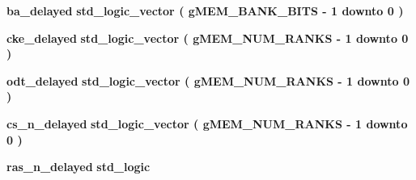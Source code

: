 \begin{DoxyCompactItemize}
\item 
{\bf ba\+\_\+delayed} {\bfseries \textcolor{comment}{std\+\_\+logic\+\_\+vector}\textcolor{vhdlchar}{ }\textcolor{vhdlchar}{(}\textcolor{vhdlchar}{ }\textcolor{vhdlchar}{ }\textcolor{vhdlchar}{ }\textcolor{vhdlchar}{ }{\bfseries {\bf g\+M\+E\+M\+\_\+\+B\+A\+N\+K\+\_\+\+B\+I\+TS}} \textcolor{vhdlchar}{-\/}\textcolor{vhdlchar}{ } \textcolor{vhdldigit}{1} \textcolor{vhdlchar}{ }\textcolor{keywordflow}{downto}\textcolor{vhdlchar}{ }\textcolor{vhdlchar}{ } \textcolor{vhdldigit}{0} \textcolor{vhdlchar}{ }\textcolor{vhdlchar}{)}\textcolor{vhdlchar}{ }} 
\item 
{\bf cke\+\_\+delayed} {\bfseries \textcolor{comment}{std\+\_\+logic\+\_\+vector}\textcolor{vhdlchar}{ }\textcolor{vhdlchar}{(}\textcolor{vhdlchar}{ }\textcolor{vhdlchar}{ }\textcolor{vhdlchar}{ }\textcolor{vhdlchar}{ }{\bfseries {\bf g\+M\+E\+M\+\_\+\+N\+U\+M\+\_\+\+R\+A\+N\+KS}} \textcolor{vhdlchar}{-\/}\textcolor{vhdlchar}{ } \textcolor{vhdldigit}{1} \textcolor{vhdlchar}{ }\textcolor{keywordflow}{downto}\textcolor{vhdlchar}{ }\textcolor{vhdlchar}{ } \textcolor{vhdldigit}{0} \textcolor{vhdlchar}{ }\textcolor{vhdlchar}{)}\textcolor{vhdlchar}{ }} 
\item 
{\bf odt\+\_\+delayed} {\bfseries \textcolor{comment}{std\+\_\+logic\+\_\+vector}\textcolor{vhdlchar}{ }\textcolor{vhdlchar}{(}\textcolor{vhdlchar}{ }\textcolor{vhdlchar}{ }\textcolor{vhdlchar}{ }\textcolor{vhdlchar}{ }{\bfseries {\bf g\+M\+E\+M\+\_\+\+N\+U\+M\+\_\+\+R\+A\+N\+KS}} \textcolor{vhdlchar}{-\/}\textcolor{vhdlchar}{ } \textcolor{vhdldigit}{1} \textcolor{vhdlchar}{ }\textcolor{keywordflow}{downto}\textcolor{vhdlchar}{ }\textcolor{vhdlchar}{ } \textcolor{vhdldigit}{0} \textcolor{vhdlchar}{ }\textcolor{vhdlchar}{)}\textcolor{vhdlchar}{ }} 
\item 
{\bf cs\+\_\+n\+\_\+delayed} {\bfseries \textcolor{comment}{std\+\_\+logic\+\_\+vector}\textcolor{vhdlchar}{ }\textcolor{vhdlchar}{(}\textcolor{vhdlchar}{ }\textcolor{vhdlchar}{ }\textcolor{vhdlchar}{ }\textcolor{vhdlchar}{ }{\bfseries {\bf g\+M\+E\+M\+\_\+\+N\+U\+M\+\_\+\+R\+A\+N\+KS}} \textcolor{vhdlchar}{-\/}\textcolor{vhdlchar}{ } \textcolor{vhdldigit}{1} \textcolor{vhdlchar}{ }\textcolor{keywordflow}{downto}\textcolor{vhdlchar}{ }\textcolor{vhdlchar}{ } \textcolor{vhdldigit}{0} \textcolor{vhdlchar}{ }\textcolor{vhdlchar}{)}\textcolor{vhdlchar}{ }} 
\item 
{\bf ras\+\_\+n\+\_\+delayed} {\bfseries \textcolor{comment}{std\+\_\+logic}\textcolor{vhdlchar}{ }} 
\item 

\end{DoxyCompactItemize}
